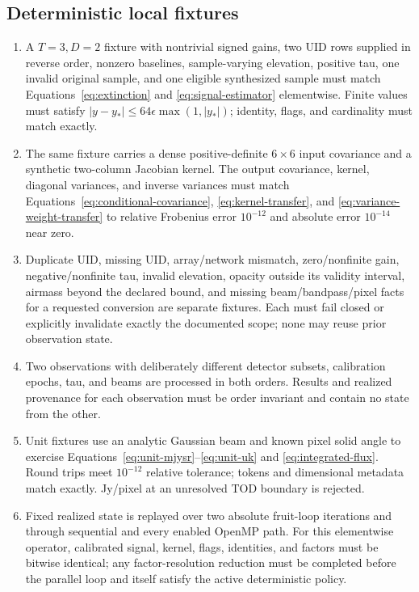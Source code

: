 \documentclass[11pt]{article}
\begin{document}
\subsection{Deterministic local fixtures}

\begin{enumerate}[label=CAL-T\arabic*,leftmargin=*]
\item A \(T=3,D=2\) fixture with nontrivial signed gains, two UID rows supplied
in reverse order, nonzero baselines, sample-varying elevation, positive tau,
one invalid original sample, and one eligible synthesized sample must match
Equations~\eqref{eq:extinction} and \eqref{eq:signal-estimator} elementwise.
Finite values must satisfy
\(|y-y_*|\le64\epsilon\max(1,|y_*|)\); identity, flags, and cardinality must
match exactly.
\item The same fixture carries a dense positive-definite \(6\times6\) input
covariance and a synthetic two-column Jacobian kernel.  The output covariance,
kernel, diagonal variances, and inverse variances must match
Equations~\eqref{eq:conditional-covariance}, \eqref{eq:kernel-transfer}, and
\eqref{eq:variance-weight-transfer} to relative Frobenius error \(10^{-12}\)
and absolute error \(10^{-14}\) near zero.
\item Duplicate UID, missing UID, array/network mismatch, zero/nonfinite gain,
negative/nonfinite tau, invalid elevation, opacity outside its validity
interval, airmass beyond the declared bound, and missing beam/bandpass/pixel
facts for a requested conversion are separate fixtures.  Each must fail closed
or explicitly invalidate exactly the documented scope; none may reuse prior
observation state.
\item Two observations with deliberately different detector subsets,
calibration epochs, tau, and beams are processed in both orders.  Results and
realized provenance for each observation must be order invariant and contain
no state from the other.
\item Unit fixtures use an analytic Gaussian beam and known pixel solid angle
to exercise Equations~\eqref{eq:unit-mjysr}--\eqref{eq:unit-uk} and
\eqref{eq:integrated-flux}.  Round trips meet \(10^{-12}\) relative tolerance;
tokens and dimensional metadata match exactly.  Jy/pixel at an unresolved TOD
boundary is rejected.
\item Fixed realized state is replayed over two absolute fruit-loop iterations
and through sequential and every enabled OpenMP path.  For this elementwise
operator, calibrated signal, kernel, flags, identities, and factors must be
bitwise identical; any factor-resolution reduction must be completed before
the parallel loop and itself satisfy the active deterministic policy.
\end{enumerate}
\end{document}
